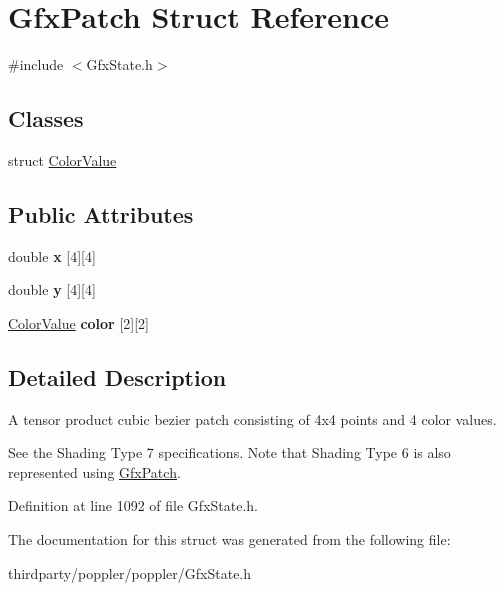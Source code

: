 \hypertarget{struct_gfx_patch}{}\section{Gfx\+Patch Struct Reference}
\label{struct_gfx_patch}


{\ttfamily \#include $<$Gfx\+State.\+h$>$}

\subsection*{Classes}
\begin{DoxyCompactItemize}
\item 
struct \hyperlink{struct_gfx_patch_1_1_color_value}{Color\+Value}
\end{DoxyCompactItemize}
\subsection*{Public Attributes}
\begin{DoxyCompactItemize}
\item 
\mbox{\label{struct_gfx_patch_ade0aa84bffca4252b47456c89844efca}} 
double {\bfseries x} \mbox{[}4\mbox{]}\mbox{[}4\mbox{]}
\item 
\mbox{\label{struct_gfx_patch_a4547b78c4eb6a4044789013c3753c48f}} 
double {\bfseries y} \mbox{[}4\mbox{]}\mbox{[}4\mbox{]}
\item 
\mbox{\label{struct_gfx_patch_a85745f122bd826ed207dfee7701be36c}} 
\hyperlink{struct_gfx_patch_1_1_color_value}{Color\+Value} {\bfseries color} \mbox{[}2\mbox{]}\mbox{[}2\mbox{]}
\end{DoxyCompactItemize}


\subsection{Detailed Description}
A tensor product cubic bezier patch consisting of 4x4 points and 4 color values.

See the Shading Type 7 specifications. Note that Shading Type 6 is also represented using \hyperlink{struct_gfx_patch}{Gfx\+Patch}. 

Definition at line 1092 of file Gfx\+State.\+h.



The documentation for this struct was generated from the following file\+:\begin{DoxyCompactItemize}
\item 
thirdparty/poppler/poppler/Gfx\+State.\+h\end{DoxyCompactItemize}
